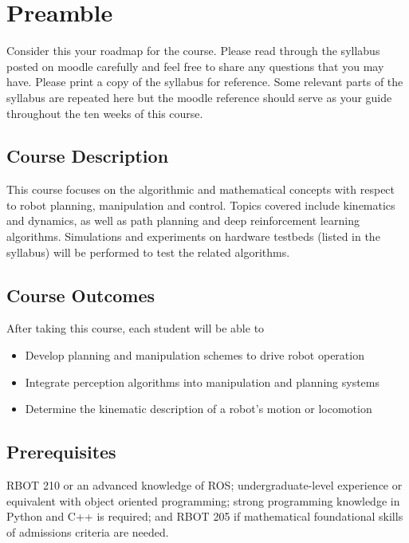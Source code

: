 \chapter{Preamble}
\label{chap:intro}

Consider this your roadmap for the course.  Please read through the syllabus posted on moodle carefully and feel free to share any questions that you may have.  Please print a copy of the syllabus for reference. Some relevant parts of the syllabus are repeated here but the moodle reference should serve as your guide throughout the ten weeks of this course.

\section{Course Description}
This course focuses on the algorithmic and mathematical concepts  with respect to robot planning, manipulation and control. Topics covered include kinematics and dynamics, as well as path planning and deep reinforcement learning algorithms. Simulations and experiments on hardware testbeds (listed in the syllabus) will be performed to test the related algorithms.

\section{Course Outcomes}
After taking this course, each student will be able to

\begin{itemize}
\item Develop planning and manipulation schemes to drive robot operation

\item Integrate perception algorithms into manipulation and planning systems

\item Determine the kinematic description of a robot's motion or locomotion
\end{itemize}

\section{Prerequisites}

RBOT 210 or an advanced knowledge of ROS; undergraduate-level experience or equivalent with object oriented programming; strong programming knowledge in Python and C++ is required; and RBOT 205 if mathematical foundational skills of admissions criteria are needed.

